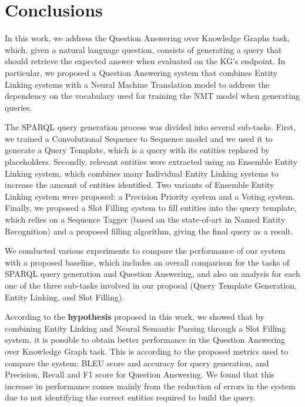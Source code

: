\chapter{Conclusions}
\label{cap6:conclusions}
In this work, we address the Question Answering over Knowledge Graphs task, which, given a natural 
language question, consists of generating a \SPARQL{} query that should retrieve the expected answer 
when evaluated on the KG’s endpoint. In particular, we proposed a Question Answering system that 
combines Entity Linking systems with a Neural Machine Translation model to address the dependency on 
the vocabulary used for training the NMT model when generating \SPARQL{} queries.

The SPARQL query generation process was divided into several sub-tasks. First, we trained a 
Convolutional Sequence to Sequence model and we used it to generate a Query Template, which is a 
\SPARQL{} query with its entities replaced by placeholders. Secondly, relevant entities were extracted 
using an Ensemble Entity Linking system, which combines many Individual Entity Linking systems to 
increase the amount of entities identified. Two variants of Ensemble Entity Linking system were 
proposed: a Precision Priority system and a Voting system. Finally, we proposed a Slot Filling system 
to fill entities into the query template, which relies on a Sequence Tagger (based on the 
state-of-art in Named Entity Recognition) and a proposed filling algorithm, giving the final \SPARQL{} 
query as a result.

We conducted various experiments to compare the performance of our system with a proposed baseline, 
which includes an overall comparison for the tasks of SPARQL query generation and Question Answering, 
and also an analysis for each one of the three sub-tasks involved in our proposal (Query Template 
Generation, Entity Linking, and Slot Filling).

According to the \textbf{hypothesis} proposed in this work, we showed that by combining Entity 
Linking and Neural Semantic Parsing through a Slot Filling system, it is possible to obtain better 
performance in the Question Answering over Knowledge Graph task. This is according to the proposed 
metrics used to compare the system: BLEU score and accuracy for \SPARQL{} query generation, and Precision, 
Recall and F1 score for Question Answering. We found that this increase in performance comes mainly 
from the reduction of errors in the system due to not identifying the correct entities required to 
build the \SPARQL{} query.

